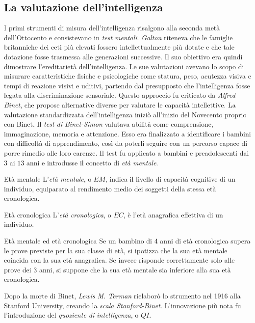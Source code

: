 \documentclass[a4paper]{article}
\begin{document}
\subsection{La valutazione dell'intelligenza}
I primi strumenti di misura dell'intelligenza risalgono alla seconda metà dell'Ottocento e consistevano in \emph{test mentali}.
\emph{Galton} riteneva che le famiglie britanniche dei ceti più elevati fossero intellettualmente più dotate e che tale dotazione fosse trasmessa alle generazioni successive. Il suo obiettivo era quindi dimostrare l'ereditarietà dell'intelligenza.
Le sue valutazioni avevano lo scopo di misurare caratteristiche fisiche e psicologiche come statura, peso, acutezza visiva e tempi di reazione visivi e uditivi, partendo dal presupposto che l'intelligenza fosse legata alla discriminazione sensoriale.
Questo approccio fu criticato da \emph{Alfred Binet}, che propose alternative diverse per valutare le capacità intellettive.
La valutazione standardizzata dell'intelligenza iniziò all'inizio del Novecento proprio con Binet. Il \emph{test di Binet-Simon} valutava abilità come comprensione, immaginazione, memoria e attenzione. Esso era finalizzato a identificare i bambini con difficoltà di apprendimento, così da poterli seguire con un percorso capace di porre rimedio alle loro carenze.
Il test fu applicato a bambini e preadolescenti dai \(3\) ai \(13\) anni e introdusse il concetto di \emph{età mentale}.
\begin{snippetdefinition}{Età mentale}
    L'\emph{età mentale}, o \(EM\), indica il livello di capacità cognitive di un individuo, equiparato al rendimento medio dei soggetti della stessa età cronologica.
\end{snippetdefinition}
\begin{snippetdefinition}{Età cronologica}
    L'\emph{età cronologica}, o \(EC\), è l'età anagrafica effettiva di un individuo.
\end{snippetdefinition}
\begin{snippetexample}{Età mentale ed età cronologica}
    Se un bambino di \(4\) anni di età cronologica supera le prove previste per la sua classe di età, si ipotizza che la sua età mentale coincida con la sua età anagrafica. Se invece risponde correttamente solo alle prove dei \(3\) anni, si suppone che la sua età mentale sia inferiore alla sua età cronologica.
\end{snippetexample}
Dopo la morte di Binet, \emph{Lewis M. Terman} rielaborò lo strumento nel 1916 alla Stanford University, creando la \emph{scala Stanford-Binet}. L'innovazione più nota fu l'introduzione del \emph{quoziente di intelligenza}, o \(QI\).
\end{document}
